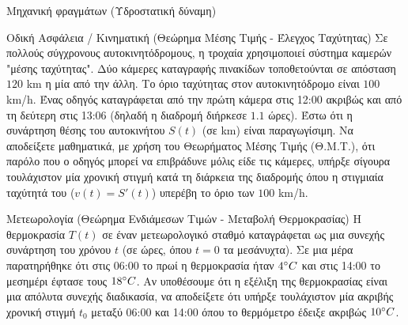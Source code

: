 \begin{problhma}{Μηχανική φραγμάτων (Υδροστατική δύναμη)}
\begin{center}
\end{center}
\end{problhma}

\begin{problhma}{Οδική Ασφάλεια / Κινηματική (Θεώρημα Μέσης Τιμής - Έλεγχος Ταχύτητας)}
Σε πολλούς σύγχρονους αυτοκινητόδρομους, η τροχαία χρησιμοποιεί σύστημα καμερών "μέσης ταχύτητας". Δύο κάμερες καταγραφής πινακίδων τοποθετούνται σε απόσταση $120$ \si{km} η μία από την άλλη. Το όριο ταχύτητας στον αυτοκινητόδρομο είναι $100$ \si{km/h}. Ένας οδηγός καταγράφεται από την πρώτη κάμερα στις 12:00 ακριβώς και από τη δεύτερη στις 13:06 (δηλαδή η διαδρομή διήρκεσε $1.1$ ώρες). Έστω ότι η συνάρτηση θέσης του αυτοκινήτου $S(t)$ (σε \si{km}) είναι παραγωγίσιμη. 
Να αποδείξετε μαθηματικά, με χρήση του Θεωρήματος Μέσης Τιμής (Θ.Μ.Τ.), ότι παρόλο που ο οδηγός μπορεί να επιβράδυνε μόλις είδε τις κάμερες, υπήρξε σίγουρα τουλάχιστον μία χρονική στιγμή κατά τη διάρκεια της διαδρομής όπου η στιγμιαία ταχύτητά του ($v(t) = S'(t)$) υπερέβη το όριο των $100$ \si{km/h}.
\end{problhma}

\begin{problhma}{Μετεωρολογία (Θεώρημα Ενδιάμεσων Τιμών - Μεταβολή Θερμοκρασίας)}
Η θερμοκρασία $T(t)$ σε έναν μετεωρολογικό σταθμό καταγράφεται ως μια συνεχής συνάρτηση του χρόνου $t$ (σε ώρες, όπου $t=0$ τα μεσάνυχτα). Σε μια μέρα παρατηρήθηκε ότι στις 06:00 το πρωί η θερμοκρασία ήταν $4\degree C$ και στις 14:00 το μεσημέρι έφτασε τους $18\degree C$. 
Αν υποθέσουμε ότι η εξέλιξη της θερμοκρασίας είναι μια απόλυτα συνεχής διαδικασία, να αποδείξετε ότι υπήρξε τουλάχιστον μία ακριβής χρονική στιγμή $t_0$ μεταξύ 06:00 και 14:00 όπου το θερμόμετρο έδειξε ακριβώς $10\degree C$.
\end{problhma}

